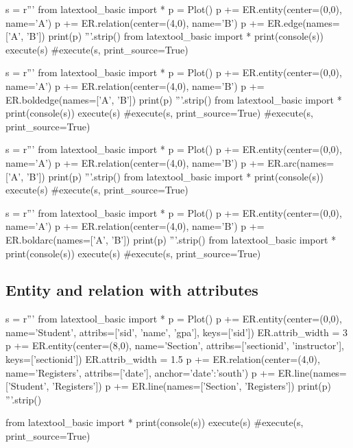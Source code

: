 \begin{python}
s = r'''
from latextool_basic import *
p = Plot()
p += ER.entity(center=(0,0), name='A')
p += ER.relation(center=(4,0), name='B')
p += ER.edge(names=['A', 'B'])
print(p)
'''.strip()
from latextool_basic import *
print(console(s))
execute(s)
#execute(s, print_source=True)
\end{python}

\begin{python}
s = r'''
from latextool_basic import *
p = Plot()
p += ER.entity(center=(0,0), name='A')
p += ER.relation(center=(4,0), name='B')
p += ER.boldedge(names=['A', 'B'])
print(p)
'''.strip()
from latextool_basic import *
print(console(s))
execute(s)
#execute(s, print_source=True)
#execute(s, print_source=True)
\end{python}

\begin{python}
s = r'''
from latextool_basic import *
p = Plot()
p += ER.entity(center=(0,0), name='A')
p += ER.relation(center=(4,0), name='B')
p += ER.arc(names=['A', 'B'])
print(p)
'''.strip()
from latextool_basic import *
print(console(s))
execute(s)
#execute(s, print_source=True)
\end{python}

\begin{python}
s = r'''
from latextool_basic import *
p = Plot()
p += ER.entity(center=(0,0), name='A')
p += ER.relation(center=(4,0), name='B')
p += ER.boldarc(names=['A', 'B'])
print(p)
'''.strip()
from latextool_basic import *
print(console(s))
execute(s)
#execute(s, print_source=True)
\end{python}


\newpage
\subsection{Entity and relation with attributes}
\begin{python}
s = r'''
from latextool_basic import *
p = Plot()
p += ER.entity(center=(0,0),
               name='Student',
               attribs=['sid', 'name', 'gpa'], keys=['sid'])
ER.attrib_width = 3
p += ER.entity(center=(8,0),
               name='Section',
               attribs=['sectionid', 'instructor'], keys=['sectionid'])
ER.attrib_width = 1.5
p += ER.relation(center=(4,0), name='Registers',
                 attribs=['date'],
                 anchor={'date':'south'})
p += ER.line(names=['Student', 'Registers'])
p += ER.line(names=['Section', 'Registers'])
print(p)
'''.strip()

from latextool_basic import *
print(console(s))
execute(s)
#execute(s, print_source=True)
\end{python}



